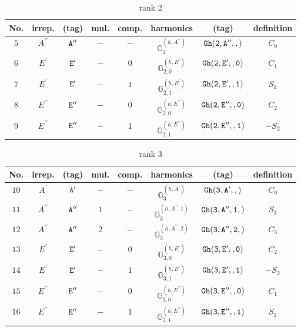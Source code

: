 \documentclass[fleqn,8pt]{jsarticle}
\begin{document}
\begin{table}[ht!]
\begin{center}
\caption{rank 2}
\renewcommand{\arraystretch}{1.3}
\begin{tabular}{cccccccc} \hline \hline
No. & irrep. & (tag) & mul. & comp. & harmonics & (tag) & definition \\ \hline
$ 5 $ & $ A^{\prime\prime} $ & $ {\tt A''} $ & $ - $ & $ - $ & $ \mathbb{G}_{2}^{(h,A^{\prime\prime})} $ & $ {\tt Gh(2,A'',,)} $ & $ C_{0} $ \\
$ 6 $ & $ E^{\prime} $ & $ {\tt E'} $ & $ - $ & $ 0 $ & $ \mathbb{G}_{2,0}^{(h,E^{\prime})} $ & $ {\tt Gh(2,E',,0)} $ & $ C_{1} $ \\
$ 7 $ & $ E^{\prime} $ & $ {\tt E'} $ & $ - $ & $ 1 $ & $ \mathbb{G}_{2,1}^{(h,E^{\prime})} $ & $ {\tt Gh(2,E',,1)} $ & $ S_{1} $ \\
$ 8 $ & $ E^{\prime\prime} $ & $ {\tt E''} $ & $ - $ & $ 0 $ & $ \mathbb{G}_{2,0}^{(h,E^{\prime\prime})} $ & $ {\tt Gh(2,E'',,0)} $ & $ C_{2} $ \\
$ 9 $ & $ E^{\prime\prime} $ & $ {\tt E''} $ & $ - $ & $ 1 $ & $ \mathbb{G}_{2,1}^{(h,E^{\prime\prime})} $ & $ {\tt Gh(2,E'',,1)} $ & $ - S_{2} $ \\
 \hline \hline
\end{tabular}
\end{center}
\end{table}
\begin{table}[ht!]
\begin{center}
\caption{rank 3}
\renewcommand{\arraystretch}{1.3}
\begin{tabular}{cccccccc} \hline \hline
No. & irrep. & (tag) & mul. & comp. & harmonics & (tag) & definition \\ \hline
$ 10 $ & $ A^{\prime} $ & $ {\tt A'} $ & $ - $ & $ - $ & $ \mathbb{G}_{3}^{(h,A^{\prime})} $ & $ {\tt Gh(3,A',,)} $ & $ C_{0} $ \\
$ 11 $ & $ A^{\prime\prime} $ & $ {\tt A''} $ & $ 1 $ & $ - $ & $ \mathbb{G}_{3}^{(h,A^{\prime\prime},1)} $ & $ {\tt Gh(3,A'',1,)} $ & $ S_{3} $ \\
$ 12 $ & $ A^{\prime\prime} $ & $ {\tt A''} $ & $ 2 $ & $ - $ & $ \mathbb{G}_{3}^{(h,A^{\prime\prime},2)} $ & $ {\tt Gh(3,A'',2,)} $ & $ C_{3} $ \\
$ 13 $ & $ E^{\prime} $ & $ {\tt E'} $ & $ - $ & $ 0 $ & $ \mathbb{G}_{3,0}^{(h,E^{\prime})} $ & $ {\tt Gh(3,E',,0)} $ & $ C_{2} $ \\
$ 14 $ & $ E^{\prime} $ & $ {\tt E'} $ & $ - $ & $ 1 $ & $ \mathbb{G}_{3,1}^{(h,E^{\prime})} $ & $ {\tt Gh(3,E',,1)} $ & $ - S_{2} $ \\
$ 15 $ & $ E^{\prime\prime} $ & $ {\tt E''} $ & $ - $ & $ 0 $ & $ \mathbb{G}_{3,0}^{(h,E^{\prime\prime})} $ & $ {\tt Gh(3,E'',,0)} $ & $ C_{1} $ \\
$ 16 $ & $ E^{\prime\prime} $ & $ {\tt E''} $ & $ - $ & $ 1 $ & $ \mathbb{G}_{3,1}^{(h,E^{\prime\prime})} $ & $ {\tt Gh(3,E'',,1)} $ & $ S_{1} $ \\
 \hline \hline
\end{tabular}
\end{center}
\end{table}
\end{document}

